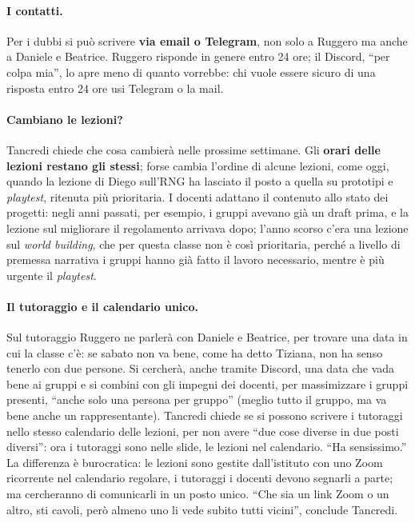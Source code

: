 \paragraph{I contatti.} Per i dubbi si può scrivere \textbf{via email o Telegram}, non solo
a Ruggero ma anche a Daniele e Beatrice. Ruggero risponde in genere entro 24 ore; il
Discord, ``per colpa mia'', lo apre meno di quanto vorrebbe: chi vuole essere sicuro di una
risposta entro 24 ore usi Telegram o la mail.

\paragraph{Cambiano le lezioni?} Tancredi chiede che cosa cambierà nelle prossime
settimane. Gli \textbf{orari delle lezioni restano gli stessi}; forse cambia l'ordine di
alcune lezioni, come oggi, quando la lezione di Diego sull'RNG ha lasciato il posto a
quella su prototipi e \emph{playtest}, ritenuta più prioritaria. I docenti adattano il
contenuto allo stato dei progetti: negli anni passati, per esempio, i gruppi avevano già un
draft prima, e la lezione sul migliorare il regolamento arrivava dopo; l'anno scorso c'era
una lezione sul \emph{world building}, che per questa classe non è così prioritaria,
perché a livello di premessa narrativa i gruppi hanno già fatto il lavoro necessario,
mentre è più urgente il \emph{playtest}.

\paragraph{Il tutoraggio e il calendario unico.} Sul tutoraggio Ruggero ne parlerà con
Daniele e Beatrice, per trovare una data in cui la classe c'è: se sabato non va bene, come
ha detto Tiziana, non ha senso tenerlo con due persone. Si cercherà, anche tramite Discord,
una data che vada bene ai gruppi e si combini con gli impegni dei docenti, per
massimizzare i gruppi presenti, ``anche solo una persona per gruppo'' (meglio tutto il
gruppo, ma va bene anche un rappresentante). Tancredi chiede se si possono scrivere i
tutoraggi nello stesso calendario delle lezioni, per non avere ``due cose diverse in due
posti diversi'': ora i tutoraggi sono nelle slide, le lezioni nel calendario. ``Ha
sensissimo.'' La differenza è burocratica: le lezioni sono gestite dall'istituto con uno
Zoom ricorrente nel calendario regolare, i tutoraggi i docenti devono segnarli a parte; ma
cercheranno di comunicarli in un posto unico. ``Che sia un link Zoom o un altro, sti
cavoli, però almeno uno li vede subito tutti vicini'', conclude Tancredi.

